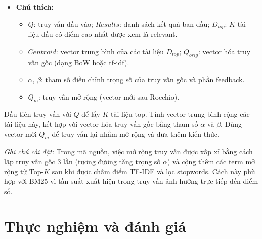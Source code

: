 \documentclass[12pt, a4paper]{article}
\begin{document}
\begin{itemize}
    \item \textbf{Chú thích:}
    \begin{itemize}
        \item $Q$: truy vấn đầu vào; $Results$: danh sách kết quả ban đầu; $D_{top}$: $K$ tài liệu đầu có điểm cao nhất được xem là relevant.
        \item $Centroid$: vector trung bình của các tài liệu $D_{top}$; $Q_{orig}$: vector hóa truy vấn gốc (dạng BoW hoặc tf-idf).
        \item $\alpha$, $\beta$: tham số điều chỉnh trọng số của truy vấn gốc và phần feedback.
        \item $Q_m$: truy vấn mở rộng (vector mới sau Rocchio).
    \end{itemize}
\end{itemize}

Đầu tiên truy vấn với $Q$ để lấy $K$ tài liệu top. Tính vector trung bình cộng các tài liệu này, kết hợp với vector hóa truy vấn gốc bằng tham số $\alpha$ và $\beta$. Dùng vector mới $Q_m$ để truy vấn lại nhằm mở rộng và đưa thêm kiến thức.

\textit{Ghi chú cài đặt:} Trong mã nguồn, việc mở rộng truy vấn được xấp xỉ bằng cách lặp truy vấn gốc 3 lần (tương đương tăng trọng số $\alpha$) và cộng thêm các term mở rộng từ Top-$K$ sau khi được chấm điểm TF-IDF và lọc stopwords. Cách này phù hợp với BM25 vì tần suất xuất hiện trong truy vấn ảnh hưởng trực tiếp đến điểm số.

\section{Thực nghiệm và đánh giá}
\end{document}
